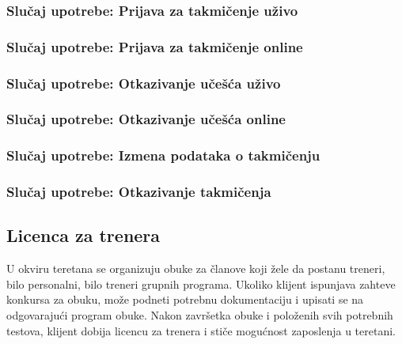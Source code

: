 \documentclass[a4paper]{article}
\begin{document}
\subsubsection{Slučaj upotrebe: Prijava za takmičenje uživo}


\subsubsection{Slučaj upotrebe: Prijava za takmičenje online}


\subsubsection{Slučaj upotrebe: Otkazivanje učešća uživo}


\subsubsection{Slučaj upotrebe: Otkazivanje učešća online}


\subsubsection{Slučaj upotrebe: Izmena podataka o takmičenju}


\subsubsection{Slučaj upotrebe: Otkazivanje takmičenja}



\newpage
\subsection{Licenca za trenera}

U okviru teretana se organizuju obuke za članove koji žele da postanu treneri, bilo personalni, bilo treneri grupnih programa. Ukoliko klijent ispunjava zahteve konkursa za obuku, može podneti potrebnu dokumentaciju i upisati se na odgovarajući program obuke. Nakon završetka obuke i položenih svih potrebnih testova, klijent dobija licencu za trenera i stiče mogućnost zaposlenja u teretani.
\end{document}
